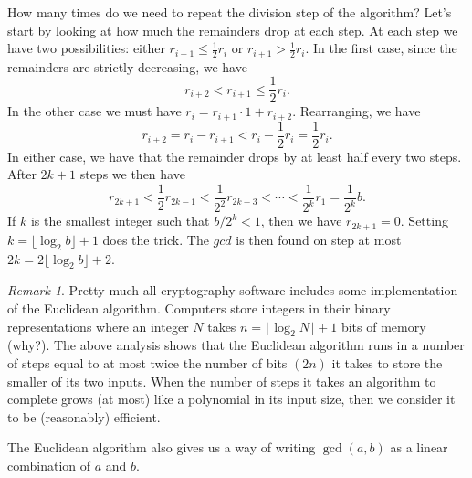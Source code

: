 \documentclass[12pt]{article}
\theoremstyle{plain}
\theoremstyle{definition}
\theoremstyle{remark}
\newtheorem{remark}[theorem]{Remark}
\begin{document}
How many times do we need to repeat the division step of the algorithm?
Let's start by looking at how much the remainders drop at each step.
At each step we have two possibilities: either $r_{i+1} \leq \frac{1}{2}r_i$ or $r_{i+1} > \frac{1}{2}r_i$.
In the first case, since the remainders are strictly decreasing, we have
\[
    r_{i+2} < r_{i+1} \leq \frac{1}{2}r_i.
\]
In the other case we must have $r_i = r_{i+1}\cdot 1 + r_{i+2}$. Rearranging, we have
\[
    r_{i+2} = r_i - r_{i+1} < r_i - \frac{1}{2}r_i = \frac{1}{2}r_i.
\]
In either case, we have that the remainder drops by at least half every two steps. After $2k+1$ steps we then have
\[
    r_{2k+1} < \frac{1}{2}r_{2k-1} < \frac{1}{2^2}r_{2k-3} < \cdots < \frac{1}{2^k}r_1 = \frac{1}{2^k}b.
\]
If $k$ is the smallest integer such that $b/2^k<1$, then we have $r_{2k+1} = 0$.
Setting $k = \lfloor \log_2 b\rfloor + 1$ does the trick.
The $gcd$ is then found on step at most $2k = 2\lfloor \log_2b\rfloor + 2$.

\begin{remark}
    Pretty much all cryptography software includes some implementation of the Euclidean algorithm.
    Computers store integers in their binary representations where an integer $N$ takes $n = \lfloor \log_2 N\rfloor +1$ bits of memory (why?). The above analysis shows that the Euclidean algorithm runs in a number of steps equal to at most twice the number of bits $(2n)$ it takes to store the smaller of its two inputs.
    When the number of steps it takes an algorithm to complete grows (at most) like a polynomial in its input size, then we consider it to be (reasonably) efficient.
\end{remark}

The Euclidean algorithm also gives us a way of writing $\gcd(a,b)$ as a linear combination of $a$ and $b$.
\end{document}
